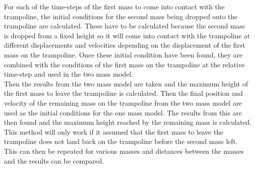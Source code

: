 
\noindent For each of the time-steps of the first mass to come into contact with the trampoline, the initial conditions for the second mass being dropped onto the trampoline are calculated. These have to be calculated because the second mass is dropped from a fixed height so it will come into contact with the trampoline at different displacements and velocities depending on the displacement of the first mass on the trampoline. Once these initial condition have been found, they are combined with the conditions of the first mass on the trampoline at the relative time-step and used in the two mass model.\\

\noindent Then the results from the two mass model are taken and the maximum height of the first mass to leave the trampoline is calculated. Then the final position and velocity of the remaining mass on the trampoline from the two mass model are used as the initial conditions for the one mass model. The results from this are then found and the maximum height reached by the remaining mass is calculated. This method will only work if it assumed that the first mass to leave the trampoline does not land back on the trampoline before the second mass left.\\

\noindent This can then be repeated for various masses and distances between the masses and the results can be compared. 




